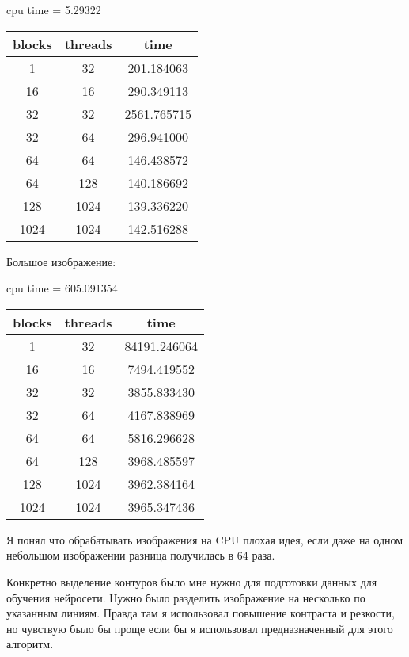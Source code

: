 \documentclass[12pt]{article}
\begin{document}
\begin{center}
	cpu time = 5.29322
	\begin{table*}[!htb]
		\centering
		\begin{tabular}{|c|c|c|}
			\hline
			blocks & threads & time        \\
			\hline

			1      & 32      & 201.184063  \\
			16     & 16      & 290.349113  \\
			32     & 32      & 2561.765715 \\
			32     & 64      & 296.941000  \\
			64     & 64      & 146.438572  \\
			64     & 128     & 140.186692  \\
			128    & 1024    & 139.336220  \\
			1024   & 1024    & 142.516288  \\
			\hline
		\end{tabular}
	\end{table*}
\end{center}

Большое изображение:

\begin{center}
	cpu time = 605.091354
	\begin{table*}[!htb]
		\centering
		\begin{tabular}{|c|c|c|}
			\hline
			blocks & threads & time         \\
			\hline

			1      & 32      & 84191.246064 \\
			16     & 16      & 7494.419552  \\
			32     & 32      & 3855.833430  \\
			32     & 64      & 4167.838969  \\
			64     & 64      & 5816.296628  \\
			64     & 128     & 3968.485597  \\
			128    & 1024    & 3962.384164  \\
			1024   & 1024    & 3965.347436  \\
			\hline
		\end{tabular}
	\end{table*}
\end{center}




Я понял что обрабатывать изображения на CPU плохая идея, если даже на одном небольшом изображении
разница получилась в 64 раза.

Конкретно выделение контуров было мне нужно для подготовки данных для обучения нейросети.
Нужно было разделить изображение на несколько по указанным линиям.
Правда там я использовал повышение контраста и резкости,
но чувствую было бы проще если бы я использовал предназначенный для этого алгоритм.
\end{document}
